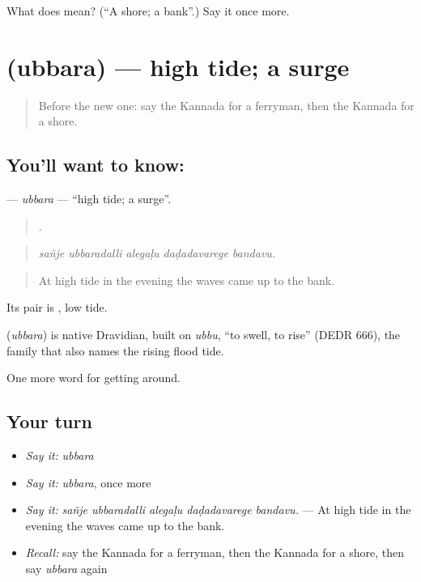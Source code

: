 \begin{tcolorbox}[breakable,colback=teal!4,colframe=teal!35!black,title={Before you move on}]
What does  mean? (\textquotedblleft{}A shore; a bank\textquotedblright{}.) Say it once more.
\end{tcolorbox}
\section[\texorpdfstring{\kn{ಉಬ್ಬರ} (ubbara)}{ಉಬ್ಬರ (ubbara)}]{ (ubbara) — high tide; a surge}

\label{lesson:KA-C454-ubbara}



\begin{quote}
Before the new one: say the Kannada for a ferryman, then the Kannada for a shore.
\end{quote}

\subsection*{You'll want to know: }
\textbf{} — \emph{ubbara} — \textquotedblleft{}high tide; a surge\textquotedblright{}.

\begin{quote}
    .
\end{quote}

\begin{quote}
\emph{sañje ubbaradalli alegaḷu daḍadavarege bandavu.}
\end{quote}

\begin{quote}
At high tide in the evening the waves came up to the bank.
\end{quote}

Its pair is , low tide.

\begin{cousinweb}
\textbf{} (\emph{ubbara}) is native Dravidian, built on \emph{ubbu}, \textquotedblleft{}to swell, to rise\textquotedblright{} (DEDR 666), the family that also names the rising flood tide.
\end{cousinweb}

\begin{grammarlens}[title={What you've built}]
One more word for getting around.
\end{grammarlens}

\subsection*{Your turn}
\begin{itemize}
\raggedright
  \item \emph{Say it:} \emph{ubbara}
  \item \emph{Say it:} \emph{ubbara}, once more
  \item \emph{Say it:} \emph{sañje ubbaradalli alegaḷu daḍadavarege bandavu.} — At high tide in the evening the waves came up to the bank.
  \item \emph{Recall:} say the Kannada for a ferryman, then the Kannada for a shore, then say \emph{ubbara} again
\end{itemize}

